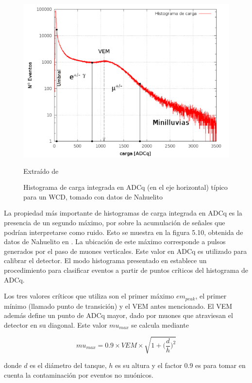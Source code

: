 \documentclass{book}
\begin{document}
\begin{figure}[ht] %
\begin{center}
 \includegraphics[width =0.8\linewidth]{HistogramaNahuelito.png}
 
 Extra\'ido de \citep{PEREZ}
\caption{Histograma de carga integrada en ADCq (en el eje horizontal) t\'ipico para un WCD, tomado con datos de Nahuelito}
\end{center}
\end{figure}

La propiedad m\'as importante de histogramas de carga integrada en ADCq es la presencia de un segundo m\'aximo, por sobre la acumulaci\'on de se\~nales que podr\'ian interpretarse como ruido. Esto se muestra en la figura 5.10, obtenida de datos de Nahuelito en \citep{PEREZ}. La ubicaci\'on de este m\'aximo corresponde a pulsos generados por el paso de muones verticales. Este valor en ADCq es utilizado para calibrar el detector. El modo histograma presentado en \citep{PEREZ} establece un procedimiento para clasificar eventos a partir de puntos cr\'iticos del histograma de ADCq.

Los tres valores cr\'iticos que utiliza son el primer m\'aximo $em_{peak}$, el primer m\'inimo (llamado punto de transici\'on) y el VEM antes mencionado. El VEM adem\'as define un punto de ADCq mayor, dado por muones que atraviesan el detector en su diagonal. Este valor $mu_{max}$ se calcula mediante

\begin{equation}
mu_{max}=0.9\times VEM\times\sqrt{1+\Bigg(\frac{d}{h}\Bigg)^2}
\end{equation}

donde $d$ es el di\'ametro del tanque, $h$ es su altura y el factor 0.9 es para tomar en cuenta la contaminaci\'on por eventos no mu\'onicos.
\end{document}
